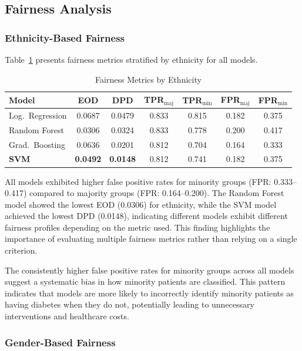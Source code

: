 \subsection{Fairness Analysis}

\subsubsection{Ethnicity-Based Fairness}

Table~\ref{tab:ethnicity_fairness} presents fairness metrics stratified by 
ethnicity for all models.

\begin{table}[H]
\centering
\caption{Fairness Metrics by Ethnicity}
\begin{tabular}{lcccccc}
\toprule
\textbf{Model} & \textbf{EOD} & \textbf{DPD} & 
\textbf{TPR$_{\text{maj}}$} & \textbf{TPR$_{\text{min}}$} & 
\textbf{FPR$_{\text{maj}}$} & \textbf{FPR$_{\text{min}}$} \\
\midrule
Log.\ Regression & 0.0687 & 0.0479 & 0.833 & 0.815 & 0.182 & 0.375 \\
Random Forest & 0.0306 & 0.0324 & 0.833 & 0.778 & 0.200 & 0.417 \\
Grad.\ Boosting & 0.0636 & 0.0201 & 0.812 & 0.704 & 0.164 & 0.333 \\
\textbf{SVM} & \textbf{0.0492} & \textbf{0.0148} & 0.812 & 0.741 & 0.182 & 0.375 \\
\bottomrule
\end{tabular}
\label{tab:ethnicity_fairness}
\end{table}

All models exhibited higher false positive rates for minority groups 
(FPR: 0.333--0.417) compared to majority groups (FPR: 0.164--0.200). 
The Random Forest model showed the lowest EOD (0.0306) for ethnicity, 
while the SVM model achieved the lowest DPD (0.0148), indicating 
different models exhibit different fairness profiles depending on the 
metric used. This finding highlights the importance of evaluating 
multiple fairness metrics rather than relying on a single criterion.

The consistently higher false positive rates for minority groups across 
all models suggest a systematic bias in how minority patients are classified. 
This pattern indicates that models are more likely to incorrectly identify 
minority patients as having diabetes when they do not, potentially leading 
to unnecessary interventions and healthcare costs.

\subsubsection{Gender-Based Fairness}

